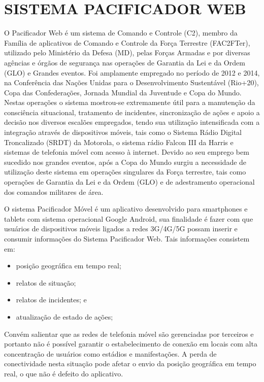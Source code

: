 \chapter{SISTEMA PACIFICADOR WEB}

O Pacificador Web é um sistema de Comando e Controle (C2), membro da Família de aplicativos de Comando e Controle da Força Terrestre (FAC2FTer), utilizado pelo Ministério da Defesa (MD), pelas Forças Armadas e por diversas agências e órgãos de segurança nas operações de Garantia da Lei e da Ordem (GLO) e Grandes eventos. Foi amplamente empregado no período de 2012 e 2014, na Conferência das Nações Unidas para o Desenvolvimento Sustentável (Rio+20), Copa das Confederações, Jornada Mundial da Juventude e Copa do Mundo. Nestas operações o sistema mostrou-se extremamente útil para a manutenção da consciência situacional, tratamento de incidentes, sincronização de ações e apoio a decisão nos diversos escalões empregados, tendo sua utilização intensificada com a integração através de dispositivos móveis, tais como o Sistema Rádio Digital Troncalizado (SRDT) da Motorola, o sistema rádio Falcon III da Harris e sistemas de telefonia móvel com acesso à internet. Devido ao seu emprego bem sucedido nos grandes eventos, após a Copa do Mundo surgiu a necessidade de utilização deste sistema em operações singulares da Força terrestre, tais como operações de Garantia da Lei e da Ordem (GLO) e de adestramento operacional dos comandos militares de área. 

O sistema Pacificador Móvel é um aplicativo desenvolvido para smartphones e tablets com sistema operacional Google Android, sua finalidade é fazer com que usuários de dispositivos móveis ligados a redes 3G/4G/5G possam inserir e consumir informações do Sistema Pacificador Web. Tais informações consistem em:
\begin{itemize}
 \item posição geográfica em tempo real;
 \item relatos de situação;
 \item relatos de incidentes; e
 \item atualização de estado de ações;
\end{itemize}


Convém salientar que as redes de telefonia móvel são gerenciadas por terceiros e portanto não é possível garantir o estabelecimento de conexão em locais com alta concentração de usuários como estádios e manifestações. A perda de conectividade nesta situação pode afetar o envio da posição geográfica em tempo real, o que não é defeito do aplicativo.

